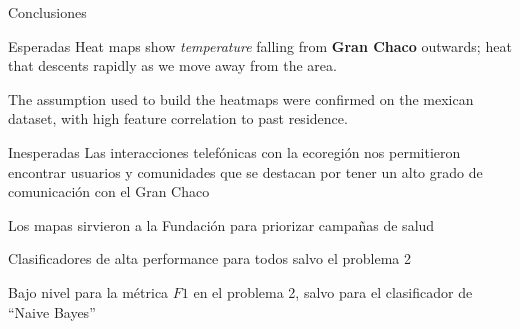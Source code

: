 \documentclass{beamer}
\begin{document}
\begin{frame}{Conclusiones}
	\begin{block}{Esperadas}
		Heat maps show \textit{temperature} falling from \textbf{Gran Chaco} outwards; heat that descents rapidly as we move away from the area.

		\medskip
		The assumption used to build the heatmaps were confirmed on the mexican dataset, with high feature correlation to past residence.

	\end{block}

	\pause

	\begin{block}{Inesperadas}
		Las interacciones telefónicas con la ecoregión  nos permitieron encontrar usuarios y comunidades que se destacan por tener un alto grado de comunicación con el Gran Chaco

		\medskip
		Los mapas sirvieron a la Fundación para priorizar campañas de salud

		\medskip
		Clasificadores de alta performance para todos salvo el problema 2

		\medskip
		Bajo nivel para la métrica $F1$ en el problema 2, salvo para el clasificador de ``Naive Bayes''
	\end{block}
\end{frame}

\end{document}
